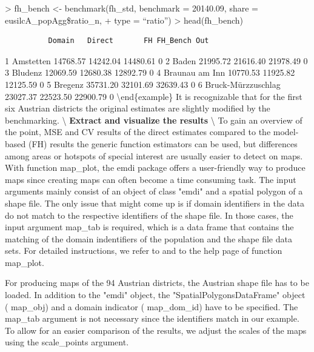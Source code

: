 \begin{example}
\textgreater{} fh\_bench \textless- benchmark(fh\_std, benchmark = 20140.09, share =
eusilcA\_popAgg\$ratio\_n,
+ type = ``ratio'')
\textgreater{} head(fh\_bench)

\begin{verbatim}
          Domain   Direct       FH FH_Bench Out
\end{verbatim}

1 Amstetten 14768.57 14242.04 14480.61 0
2 Baden 21995.72 21616.40 21978.49 0
3 Bludenz 12069.59 12680.38 12892.79 0
4 Braunau am Inn 10770.53 11925.82 12125.59 0
5 Bregenz 35731.20 32101.69 32639.43 0
6 Bruck-Mürzzuschlag 23027.37 22523.50 22900.79 0
\textbackslash end\{example\}
It is recognizable that for the first six Austrian districts the original estimates are slightly modified by the benchmarking.
\textbackslash{} \newline
\textbf{Extract and visualize the results} \textbackslash{}
To gain an overview of the point, MSE and CV results of the direct estimates compared to the model-based (FH) results the generic function \texorpdfstring%
{{\normalfont\ttfamily\hyphenchar{} estimators}}%
{estimators} \citep{emdi2019} can be used, but differences among areas or hotspots of special interest are usually easier to detect on maps. With function \texorpdfstring%
{{\normalfont\ttfamily\hyphenchar{} map\_plot}}%
{map\_plot}, the \texorpdfstring%
{{\normalfont{}\selectfont emdi}}%
{emdi} package offers a user-friendly way to produce maps since creating maps can often become a time consuming task. The input arguments mainly consist of an object of class \texorpdfstring%
{{\normalfont\ttfamily\hyphenchar{} "emdi"}}%
{"emdi"} and a spatial polygon of a shape file. The only issue that might come up is if domain identifiers in the data do not match to the respective identifiers of the shape file. In those cases, the input argument \texorpdfstring%
{{\normalfont\ttfamily\hyphenchar{} map\_tab}}%
{map\_tab} is required, which is a data frame that contains the matching of the domain indentifiers of the population and the shape file data sets. For detailed instructions, we refer to \citet{emdi2019} and to the help page of function \texorpdfstring%
{{\normalfont\ttfamily\hyphenchar{} map\_plot}}%
{map\_plot}.

For producing maps of the 94 Austrian districts, the Austrian shape file has to be loaded. In addition to the \texorpdfstring%
{{\normalfont\ttfamily\hyphenchar{} "emdi"}}%
{"emdi"} object, the \texorpdfstring%
{{\normalfont\ttfamily\hyphenchar{} "SpatialPolygonsDataFrame"}}%
{"SpatialPolygonsDataFrame"} object (\texorpdfstring%
{{\normalfont\ttfamily\hyphenchar{} map\_obj}}%
{map\_obj}) and a domain indicator (\texorpdfstring%
{{\normalfont\ttfamily\hyphenchar{} map\_dom\_id}}%
{map\_dom\_id}) have to be specified. The \texorpdfstring%
{{\normalfont\ttfamily\hyphenchar{} map\_tab}}%
{map\_tab} argument is not necessary since the identifiers match in our example. To allow for an easier comparison of the results, we adjust the scales of the maps using the \texorpdfstring%
{{\normalfont\ttfamily\hyphenchar{} scale\_points}}%
{scale\_points} argument.


\end{example}

